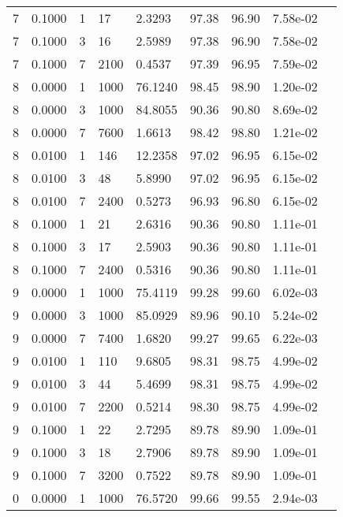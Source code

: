 \begin{longtable}{@{}lllllllll@{}}
7           & 0.1000 & 1   & 17     & 2.3293  & 97.38   & 96.90   & 7.58e-02 &  \\
7           & 0.1000 & 3   & 16     & 2.5989  & 97.38   & 96.90   & 7.58e-02 &  \\
7           & 0.1000 & 7   & 2100   & 0.4537  & 97.39   & 96.95   & 7.59e-02 &  \\
8           & 0.0000 & 1   & 1000   & 76.1240 & 98.45   & 98.90   & 1.20e-02 &  \\
8           & 0.0000 & 3   & 1000   & 84.8055 & 90.36   & 90.80   & 8.69e-02 &  \\
8           & 0.0000 & 7   & 7600   & 1.6613  & 98.42   & 98.80   & 1.21e-02 &  \\
8           & 0.0100 & 1   & 146    & 12.2358 & 97.02   & 96.95   & 6.15e-02 &  \\
8           & 0.0100 & 3   & 48     & 5.8990  & 97.02   & 96.95   & 6.15e-02 &  \\
8           & 0.0100 & 7   & 2400   & 0.5273  & 96.93   & 96.80   & 6.15e-02 &  \\
8           & 0.1000 & 1   & 21     & 2.6316  & 90.36   & 90.80   & 1.11e-01 &  \\
8           & 0.1000 & 3   & 17     & 2.5903  & 90.36   & 90.80   & 1.11e-01 &  \\
8           & 0.1000 & 7   & 2400   & 0.5316  & 90.36   & 90.80   & 1.11e-01 &  \\
9           & 0.0000 & 1   & 1000   & 75.4119 & 99.28   & 99.60   & 6.02e-03 &  \\
9           & 0.0000 & 3   & 1000   & 85.0929 & 89.96   & 90.10   & 5.24e-02 &  \\
9           & 0.0000 & 7   & 7400   & 1.6820  & 99.27   & 99.65   & 6.22e-03 &  \\
9           & 0.0100 & 1   & 110    & 9.6805  & 98.31   & 98.75   & 4.99e-02 &  \\
9           & 0.0100 & 3   & 44     & 5.4699  & 98.31   & 98.75   & 4.99e-02 &  \\
9           & 0.0100 & 7   & 2200   & 0.5214  & 98.30   & 98.75   & 4.99e-02 &  \\
9           & 0.1000 & 1   & 22     & 2.7295  & 89.78   & 89.90   & 1.09e-01 &  \\
9           & 0.1000 & 3   & 18     & 2.7906  & 89.78   & 89.90   & 1.09e-01 &  \\
9           & 0.1000 & 7   & 3200   & 0.7522  & 89.78   & 89.90   & 1.09e-01 &  \\
0           & 0.0000 & 1   & 1000   & 76.5720 & 99.66   & 99.55   & 2.94e-03 &  \\

\end{longtable}

